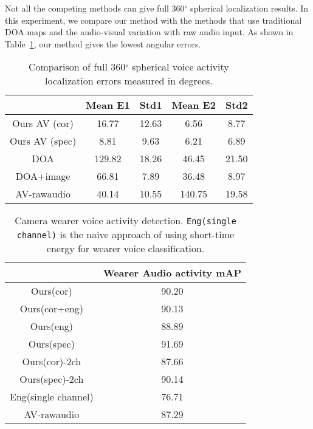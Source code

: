 \documentclass[10pt,twocolumn,letterpaper]{article}
\begin{document}
Not all the competing methods can give full 360$^{\circ}$ spherical localization results.
In this experiment, we compare our method with the methods that use traditional DOA maps and the audio-visual variation with raw audio input.
As shown in Table~\ref{tab:vloc360}, our method gives the lowest angular errors. 


\setlength{\tabcolsep}{1pt}
\begin{table}[tbh]
  \small	
  \centering
  \begin{tabular}{ c | c | c | c | c }
    \hline
				     & Mean E1 & Std1   & Mean E2 & Std2  \\ \hline
                      Ours AV (cor) & 16.77   & 12.63  & 6.56   & 8.77 \\
		      Ours AV (spec) & 8.81   & 9.63  & 6.21   & 6.89 \\
		      DOA            & 129.82  & 18.26  & 46.45   & 21.50 \\
                      DOA+image       & 66.81  & 7.89  & 36.48   & 8.97 \\
		      AV-rawaudio    & 40.14     &  10.55    &  140.75     &  19.58   \\
    \hline
  \end{tabular}
\caption{Comparison of full 360$^{\circ}$ spherical voice activity localization errors measured in degrees.}
        \label{tab:vloc360}
\vspace{-10pt}	
\end{table}


\setlength{\tabcolsep}{1pt}
\begin{table}[tbh]	
  \small	
  \centering	
  \begin{tabular}{ c | c  }
    \hline
		      & Wearer Audio activity mAP  \\ \hline
		      Ours(cor) & 90.20  \\               
	              Ours(cor+eng) & 90.13  \\    
		      Ours(eng) & 88.89   \\
		      Ours(spec) & 91.69  \\
		      Ours(cor)-2ch & 87.66   \\
		      Ours(spec)-2ch & 90.14     \\
		      Eng(single channel) & 76.71 \\
		      AV-rawaudio & 87.29 \\

    \hline
  \end{tabular}
\caption{Camera wearer voice activity detection. \texttt{Eng(single channel)} is the 
	naive approach of using short-time energy for wearer voice classification.}
	\label{tab:wearer}
\vspace{-10pt}	
\end{table}
\end{document}

